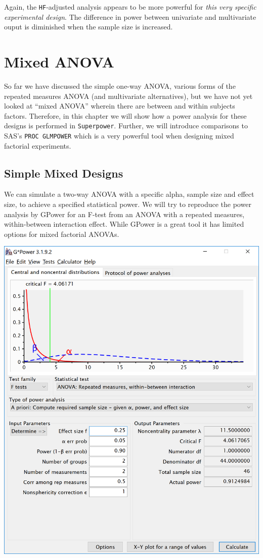 \documentclass[]{book}
\begin{document}
Again, the \texttt{HF}-adjusted analysis appears to be more powerful for \emph{this very specific experimental design}. The difference in power between univariate and multivariate ouput is diminished when the sample size is increased.

\hypertarget{mixed-anova}{%
\chapter{Mixed ANOVA}\label{mixed-anova}}

So far we have discussed the simple one-way ANOVA, various forms of the repeated measures ANOVA (and multivariate alternatives), but we have not yet looked at ``mixed ANOVA'' wherein there are between and within subjects factors. Therefore, in this chapter we will show how a power analysis for these designs is performed in \texttt{Superpower}. Further, we will introduce comparisons to SAS's \texttt{PROC\ GLMPOWER} which is a very powerful tool when designing mixed factorial experiments.

\hypertarget{simple-mixed-designs}{%
\section{Simple Mixed Designs}\label{simple-mixed-designs}}

We can simulate a two-way ANOVA with a specific alpha, sample size and effect size, to achieve a specified statistical power. We will try to reproduce the power analysis by GPower \citep{faul2007g} for an F-test from an ANOVA with a repeated measures, within-between interaction effect. While GPower is a great tool it has limited options for mixed factorial ANOVAs.

\includegraphics{screenshots/gpower_5.png}
\end{document}
